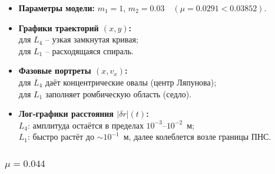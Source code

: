 \documentclass[12pt]{article}
\begin{document}
\begin{itemize}
  \item \textbf{Параметры модели:} $m_1=1$, $m_2=0.03\quad(\mu=0.0291<0.03852)$.
  \item \textbf{Графики траекторий $(x,y)$:}\\
        для $L_4$ -- узкая замкнутая кривая;\\
        для $L_1$ -- расходящаяся спираль. 
  \item \textbf{Фазовые портреты $(x,v_x)$:}\\
        для $L_4$ даёт концентрические овалы (центр Ляпунова);\\
        для $L_1$ заполняет ромбическую область (седло).
  \item \textbf{Лог‑графики расстояния $|\delta r|(t)$:}\\
        $L_4$: амплитуда остаётся в пределах $10^{-3}$--$10^{-2}$~м;\\
        $L_1$: быстро растёт до $\sim10^{-1}$~м, далее колеблется возле границы ПНС.
\end{itemize}

\subsubsection{$\mu=0.044$} 
\end{document}
